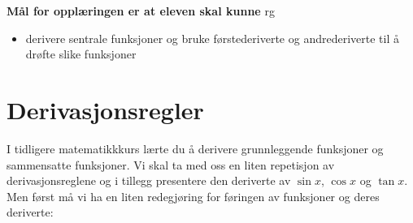 

 

\eqlen	
\textbf{Mål for opplæringen er at eleven skal kunne}
{rg}
\begin{itemize}
	\item derivere sentrale funksjoner og bruke førstederiverte og andrederiverte til å drøfte slike funksjoner
\end{itemize}

\newpage


\begin{comment}
En funksjon $ f(u(x)) $ er avhengig av funksjonen $ u $, som igjen er avhengig av variabelen $ x $. Dette betyr at $ f $ kan deriveres med hensyn på enten $ u $ eller $ x $. Så lenge $ x $ er den uavhengige variabelen vil $ f'$ fremdeles bety $ f'(x) $, mens $ f'(u) $ altså indikerer $ f $ \textsl{derivert med hensyn på} $ u $.
\end{comment}
\section{Derivasjonsregler}
I tidligere matematikkkurs lærte du å derivere grunnleggende funksjoner og sammensatte funksjoner. Vi skal ta med oss en liten repetisjon av derivasjonsreglene og i tillegg presentere den deriverte av $ \sin x $, $ \cos x $ og $ \tan x $. Men først må vi ha en liten redegjøring for føringen av funksjoner og deres deriverte:\vsk

